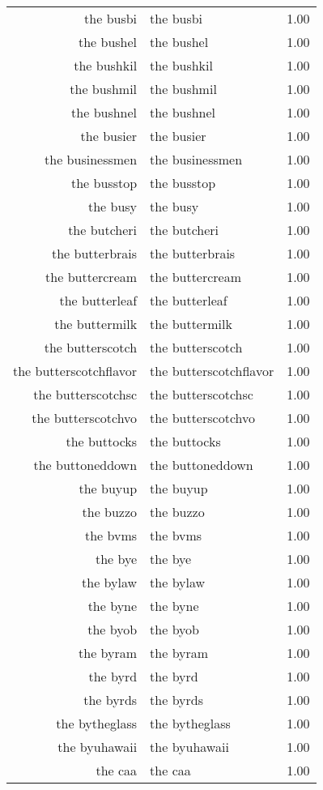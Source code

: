 \begin{table}[ht]
\begin{tabular}{rlr}
  the busbi & the busbi & 1.00 \\ 
  the bushel & the bushel & 1.00 \\ 
  the bushkil & the bushkil & 1.00 \\ 
  the bushmil & the bushmil & 1.00 \\ 
  the bushnel & the bushnel & 1.00 \\ 
  the busier & the busier & 1.00 \\ 
  the businessmen & the businessmen & 1.00 \\ 
  the busstop & the busstop & 1.00 \\ 
  the busy & the busy & 1.00 \\ 
  the butcheri & the butcheri & 1.00 \\ 
  the butterbrais & the butterbrais & 1.00 \\ 
  the buttercream & the buttercream & 1.00 \\ 
  the butterleaf & the butterleaf & 1.00 \\ 
  the buttermilk & the buttermilk & 1.00 \\ 
  the butterscotch & the butterscotch & 1.00 \\ 
  the butterscotchflavor & the butterscotchflavor & 1.00 \\ 
  the butterscotchsc & the butterscotchsc & 1.00 \\ 
  the butterscotchvo & the butterscotchvo & 1.00 \\ 
  the buttocks & the buttocks & 1.00 \\ 
  the buttoneddown & the buttoneddown & 1.00 \\ 
  the buyup & the buyup & 1.00 \\ 
  the buzzo & the buzzo & 1.00 \\ 
  the bvms & the bvms & 1.00 \\ 
  the bye & the bye & 1.00 \\ 
  the bylaw & the bylaw & 1.00 \\ 
  the byne & the byne & 1.00 \\ 
  the byob & the byob & 1.00 \\ 
  the byram & the byram & 1.00 \\ 
  the byrd & the byrd & 1.00 \\ 
  the byrds & the byrds & 1.00 \\ 
  the bytheglass & the bytheglass & 1.00 \\ 
  the byuhawaii & the byuhawaii & 1.00 \\ 
  the caa & the caa & 1.00 \\ 

\end{tabular}
\end{table}
